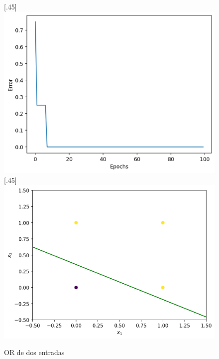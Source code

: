 \documentclass[12pt,a4paper]{article}
\begin{document}
\begin{figure}[H]
  [.45\linewidth]{
    \includegraphics[width=\linewidth]{img/3-training_error.png}
  }
  [.45\linewidth]{
    \includegraphics[width=\linewidth]{img/4-desicion_boundary.png}
  }
  \caption*{OR de dos entradas}
  \centering
\end{figure}
\end{document}
